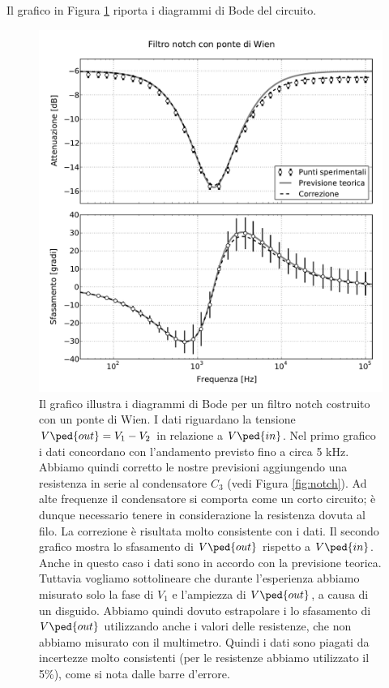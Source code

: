 Il grafico in Figura \ref{fig:g} riporta i diagrammi di Bode del circuito.

\begin{figure}
    \includegraphics[scale=0.50]{g.pdf}
    \caption{Il grafico illustra i diagrammi di Bode per un filtro notch costruito con un
        ponte di Wien.
        I dati riguardano la tensione $V\ped{out} = V_1 - V_2$ in relazione a $V\ped{in}$. 
        Nel primo grafico i dati concordano con l'andamento previsto
        fino a circa 5 kHz. Abbiamo quindi corretto le nostre previsioni aggiungendo una resistenza
        in serie al condensatore $C_3$ (vedi Figura \ref{fig:notch}). Ad alte frequenze il
        condensatore si comporta come un corto circuito; è dunque necessario tenere in
        considerazione la resistenza dovuta al filo.
        La correzione è risultata molto consistente con i dati.
        Il secondo grafico mostra lo sfasamento di
        $V\ped{out}$ rispetto a $V\ped{in}$. Anche in questo caso i dati sono in accordo
        con la previsione teorica. Tuttavia vogliamo sottolineare che durante l'esperienza
        abbiamo misurato solo la fase di $V_1$ e l'ampiezza di $V\ped{out}$, a causa di un
        disguido. Abbiamo quindi dovuto estrapolare i lo sfasamento di $V\ped{out}$ utilizzando
        anche i valori delle resistenze, che non abbiamo misurato con il multimetro. Quindi
        i dati sono piagati da incertezze molto consistenti (per le resistenze
        abbiamo utilizzato il 5\%), come si nota dalle barre d'errore. 
    }
    \label{fig:g}
\end{figure}
